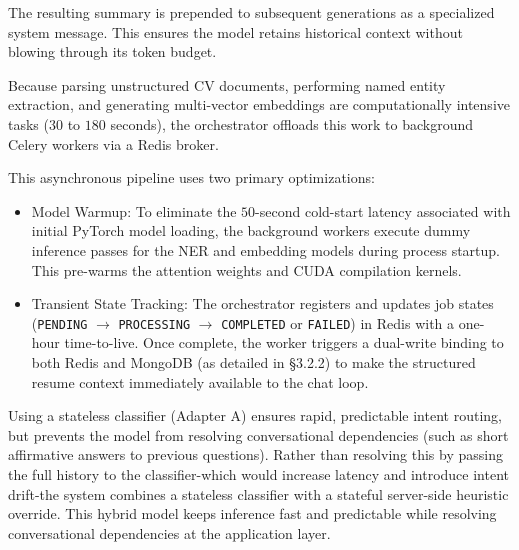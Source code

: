 \documentclass[12pt, a4paper]{report}
\begin{document}
The resulting summary is prepended to subsequent generations as a specialized system message. This ensures the model retains historical context without blowing through its token budget.

\vspace{0.6cm}
\vspace{0.4cm}

Because parsing unstructured CV documents, performing named entity extraction, and generating multi-vector embeddings are computationally intensive tasks ($30$ to $180$ seconds), the orchestrator offloads this work to background Celery workers via a Redis broker.

This asynchronous pipeline uses two primary optimizations:
\begin{itemize}
    \item Model Warmup: To eliminate the $50$-second cold-start latency associated with initial PyTorch model loading, the background workers execute dummy inference passes for the NER and embedding models during process startup. This pre-warms the attention weights and CUDA compilation kernels.
    \item Transient State Tracking: The orchestrator registers and updates job states (\texttt{PENDING} $\rightarrow$ \texttt{PROCESSING} $\rightarrow$ \texttt{COMPLETED} or \texttt{FAILED}) in Redis with a one-hour time-to-live. Once complete, the worker triggers a dual-write binding to both Redis and MongoDB (as detailed in §3.2.2) to make the structured resume context immediately available to the chat loop.
\end{itemize}

\vspace{0.6cm}
\vspace{0.4cm}

\vspace{0.3cm}

Using a stateless classifier (Adapter A) ensures rapid, predictable intent routing, but prevents the model from resolving conversational dependencies (such as short affirmative answers to previous questions). Rather than resolving this by passing the full history to the classifier-which would increase latency and introduce intent drift-the system combines a stateless classifier with a stateful server-side heuristic override. This hybrid model keeps inference fast and predictable while resolving conversational dependencies at the application layer.
\end{document}
